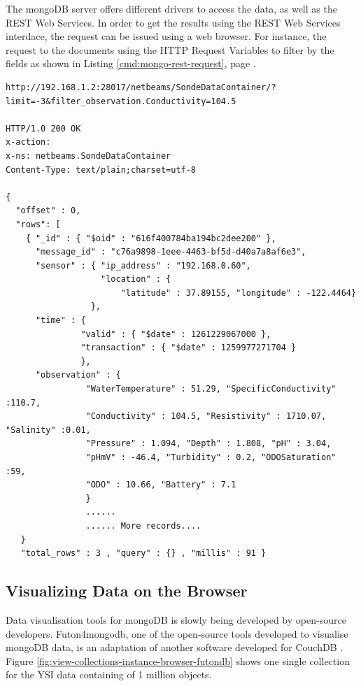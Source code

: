The mongoDB server offers different drivers to access the data, as well as the
REST Web Services. In order to get the results using the REST Web Services
interdace, the request can be issued using a web browser. For instance, the
request to the documents using the HTTP Request Variables to filter by the
fields as shown in Listing \ref{cmd:mongo-rest-request}, page
\pageref{cmd:mongo-rest-request}.

\lstset{label=cmd:mongo-rest-request,caption=REST HTTP Interface Example}
\begin{lstlisting}
http://192.168.1.2:28017/netbeams/SondeDataContainer/?limit=-3&filter_observation.Conductivity=104.5

HTTP/1.0 200 OK
x-action:
x-ns: netbeams.SondeDataContainer
Content-Type: text/plain;charset=utf-8

{
  "offset" : 0,
  "rows": [
    { "_id" : { "$oid" : "616f400784ba194bc2dee200" }, 
      "message_id" : "c76a9898-1eee-4463-bf5d-d40a7a8af6e3", 
      "sensor" : { "ip_address" : "192.168.0.60", 
                   "location" : {
                       "latitude" : 37.89155, "longitude" : -122.4464} 
                 }, 
      "time" : { 
               "valid" : { "$date" : 1261229067000 },
               "transaction" : { "$date" : 1259977271704 } 
               },
      "observation" : { 
                "WaterTemperature" : 51.29, "SpecificConductivity" :110.7,
                "Conductivity" : 104.5, "Resistivity" : 1710.07, "Salinity" :0.01, 
                "Pressure" : 1.094, "Depth" : 1.808, "pH" : 3.04,
                "pHmV" : -46.4, "Turbidity" : 0.2, "ODOSaturation" :59, 
                "ODO" : 10.66, "Battery" : 7.1 
                } 
                ......
                ...... More records....
   } 
   "total_rows" : 3 , "query" : {} , "millis" : 91 }
\end{lstlisting}

\subsection{Visualizing Data on the Browser}

Data visualisation tools for mongoDB is slowly being developed by open-source
developers. Futon4mongodb, one of the open-source tools developed to visualise
mongoDB data, is an adaptation of another software developed for CouchDB
\cite{couchdb}. Figure \ref{fig:view-collections-instance-browser-futondb}
shows one single collection for the YSI data containing of 1 million objects.

